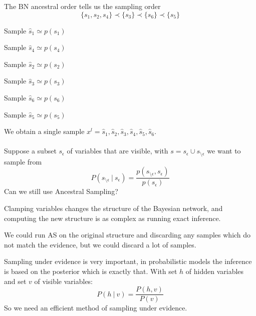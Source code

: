 \documentclass[10pt]{report}
\begin{document}
The BN ancestral order tells us the sampling order
$$\{s_1,s_2,s_4\}\prec\{s_3\}\prec\{s_6\}\prec\{s_5\}$$\begin{list}{}{}
	\item Sample $\hat{s}_1\simeq p(s_1)$
	\item Sample $\hat{s}_4\simeq p(s_4)$
	\item Sample $\hat{s}_2\simeq p(s_2)$
	\item Sample $\hat{s}_3\simeq p(s_3)$
	\item Sample $\hat{s}_6\simeq p(s_6)$
	\item Sample $\hat{s}_5\simeq p(s_5)$
\end{list}
We obtain a single sample $x^l = \hat{s}_1,\hat{s}_2,\hat{s}_3,\hat{s}_4,\hat{s}_5,\hat{s}_6$.\\\\
Suppose a subset $s_\epsilon$ of variables that are visible, with $s=s_\epsilon\cup s_{\setminus\epsilon}$ we want to sample from $$P(s_{\setminus\epsilon}\:|\:s_\epsilon) = \frac{p(s_{\setminus\epsilon}, s_\epsilon)}{p(s_\epsilon)}$$
Can we still use Ancestral Sampling?\begin{list}{}{}
	\item Clamping variables changes the structure of the Bayesian network, and computing the new structure is as complex as running exact inference.
	\item We could run AS on the original structure and discarding any samples which do not match the evidence, but we could discard a lot of samples.
\end{list}
Sampling under evidence is very important, in probabilistic models the inference is based on the posterior which is exactly that. With set $h$ of hidden variables and set $v$ of visible variables:
$$P(h\:|\:v)=\frac{P(h,v)}{P(v)}$$
So we need an efficient method of sampling under evidence.
\end{document}
